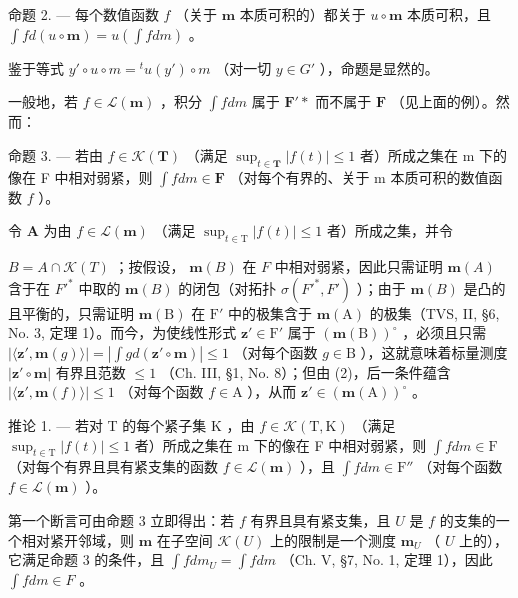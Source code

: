 命题 2. --- 每个数值函数 \(f\) （关于 \(\mathbf{m}\) 本质可积的）都关于 \(u \circ \mathbf{m}\) 本质可积，且 \(\int f d(u \circ \mathbf{m}) = u\left(\int f dm\right)\) 。

鉴于等式 \(y'\circ u\circ m = {}^{t}u(y')\circ m\) （对一切 \(y \in G'\) ），命题是显然的。

一般地，若 \(f \in \mathcal{L}(\mathbf{m})\) ，积分 \(\int f dm\) 属于 \(\mathbf{F}'*\) 而不属于 \(\mathbf{F}\) （见上面的例）。然而：

命题 3. --- 若由 \(f \in \mathcal{K}(\mathbf{T})\) （满足 \(\sup_{t \in \mathbf{T}} |f(t)| \leqslant 1\) 者）所成之集在 m 下的像在 F 中相对弱紧，则 \(\int f dm \in \mathbf{F}\) （对每个有界的、关于 m 本质可积的数值函数 \(f\) ）。

令 \(\mathbf{A}\) 为由 \(f\in \mathcal{L}(\mathbf{m})\) （满足 \(\sup_{t\in \mathrm{T}}|f(t)|\leqslant 1\) 者）所成之集，并令

\(B = A \cap \mathcal{K}(T)\) ；按假设， \(\mathbf{m}(B)\) 在 \(F\) 中相对弱紧，因此只需证明 \(\mathbf{m}(A)\) 含于在 \(F'^*\) 中取的 \(\mathbf{m}(B)\) 的闭包（对拓扑 \(\sigma(F'^*, F')\) ）；由于 \(\mathbf{m}(B)\) 是凸的且平衡的，只需证明 \(\mathbf{m}(\mathrm{B})\) 在 \(\mathrm{F}'\) 中的极集含于 \(\mathbf{m}(\mathrm{A})\) 的极集（TVS, II, §6, No. 3, 定理 1）。而今，为使线性形式 \(\mathbf{z}' \in \mathrm{F}'\) 属于 \((\mathbf{m}(\mathrm{B}))^\circ\) ，必须且只需 \(|\langle \mathbf{z}', \mathbf{m}(g) \rangle| = |\int g d(\mathbf{z}' \circ \mathbf{m})| \leqslant 1\) （对每个函数 \(g \in \mathrm{B}\) ），这就意味着标量测度 \(|\mathbf{z}' \circ \mathbf{m}|\) 有界且范数 \(\leqslant 1\) （Ch. III, §1, No. 8）；但由 (2)，后一条件蕴含 \(|\langle \mathbf{z}', \mathbf{m}(f) \rangle| \leqslant 1\) （对每个函数 \(f \in \mathrm{A}\) ），从而 \(\mathbf{z}' \in (\mathbf{m}(\mathrm{A}))^\circ\) 。

推论 1. --- 若对 T 的每个紧子集 K ，由 \(f \in \mathcal{K}(\mathrm{T},\mathrm{K})\) （满足 \(\sup_{t \in \mathrm{T}} |f(t)| \leqslant 1\) 者）所成之集在 m 下的像在 F 中相对弱紧，则 \(\int f dm \in \mathrm{F}\) （对每个有界且具有紧支集的函数 \(f \in \mathcal{L}(\mathbf{m})\) ），且 \(\int f dm \in \mathrm{F}''\) （对每个函数 \(f \in \mathcal{L}(\mathbf{m})\) ）。

第一个断言可由命题 3 立即得出：若 \(f\) 有界且具有紧支集，且 \(U\) 是 \(f\) 的支集的一个相对紧开邻域，则 \(\mathbf{m}\) 在子空间 \(\mathcal{K}(U)\) 上的限制是一个测度 \(\mathbf{m}_U\) （ \(U\) 上的），它满足命题 3 的条件，且 \(\int f dm_U = \int f dm\) （Ch. V, §7, No. 1, 定理 1），因此 \(\int f dm \in F\) 。

